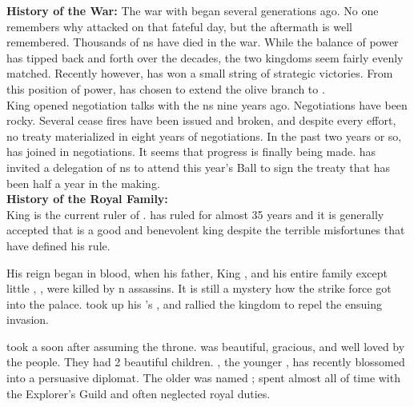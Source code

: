 \documentclass[blue]{NeptuneBall}
\begin{document}
\name{\bAtlantian{}}


{\bf History of the War:}
The war with \pPacifica{} began several generations ago. No one remembers why \pPacifica{} attacked on that fateful day, but the aftermath is well remembered. Thousands of \pAtlantis{}ns have died in the war. While the balance of power has tipped back and forth over the decades, the two kingdoms seem fairly evenly matched. Recently however, \pAtlantis{} has won a small string of strategic victories. From this position of power, \cKing{\King} \cKing{} has chosen to extend the olive branch to \pPacifica{}.\\

King \cKing{\MYname{}} opened negotiation talks with the \pPacifica{}ns nine years ago. Negotiations have been rocky. Several cease fires have been issued and broken, and despite every effort, no treaty materialized in eight years of negotiations. In the past two years or so, \cPrincess{\Prince} \cPrincess{} has joined \cPrincess{\their} \cKing{\parent} in negotiations. It seems that progress is finally being made. \cKing{\King} \cKing{} has  invited a delegation of \pPacifica{}ns to attend this year's \cExExKing{} Ball to sign the treaty that has been half a year in the making.\\

{\bf History of the Royal Family:}\\
King \cKing{\MYname{}} is the current ruler of \pAtlantis{}. \cKing{\They} has ruled for almost 35 years and it is generally accepted that \cKing{\they} is a good and benevolent king despite the terrible misfortunes that have defined his rule.

His reign began in blood, when his father, King \cExKing{}, and his entire family except \cKing{\their} little \cPlant{\sibling}, \cPlant{}, were killed by \pPacifica{}n assassins. It is still a mystery how the strike force got into the palace. \cKing{} took up his \cExKing{\parent}'s \iTrident{\MYname{}}, and rallied the kingdom to repel the ensuing invasion.

\cKing{\King} \cKing{} took a \cQueen{\spouse} soon after assuming the throne. \cQueen{\King} \cQueen{\MYname{}} was beautiful, gracious, and well loved by the people. They had 2 beautiful children. \cPrincess{\Prince} \cPrincess{}, the younger \cPrincess{\offspring}, has recently blossomed into a persuasive diplomat. The older \cAriel{\Prince} was named \cAriel{}; \cAriel{} spent almost all of \cAriel{\their} time with the Explorer's Guild and often neglected \cAriel{\their} royal duties. 
\end{document}
